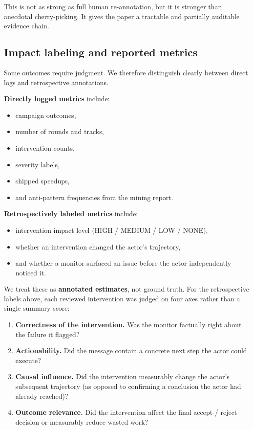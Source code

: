 \documentclass[11pt]{article}
\begin{document}
This is not as strong as full human re-annotation, but it is stronger than anecdotal cherry-picking. It gives the paper a tractable and partially auditable evidence chain.

\subsection{Impact labeling and reported metrics}
\label{sec:impact-labeling}

Some outcomes require judgment. We therefore distinguish clearly between direct logs and retrospective annotations.

\textbf{Directly logged metrics} include:
\begin{itemize}[leftmargin=*,itemsep=2pt]
  \item campaign outcomes,
  \item number of rounds and tracks,
  \item intervention counts,
  \item severity labels,
  \item shipped speedups,
  \item and anti-pattern frequencies from the mining report.
\end{itemize}

\textbf{Retrospectively labeled metrics} include:
\begin{itemize}[leftmargin=*,itemsep=2pt]
  \item intervention impact level (HIGH / MEDIUM / LOW / NONE),
  \item whether an intervention changed the actor's trajectory,
  \item and whether a monitor surfaced an issue before the actor independently noticed it.
\end{itemize}

We treat these as \textbf{annotated estimates}, not ground truth. For the retrospective labels above, each reviewed intervention was judged on four axes rather than a single summary score:

\begin{enumerate}[leftmargin=*,itemsep=2pt]
  \item \textbf{Correctness of the intervention.} Was the monitor factually right about the failure it flagged?
  \item \textbf{Actionability.} Did the message contain a concrete next step the actor could execute?
  \item \textbf{Causal influence.} Did the intervention measurably change the actor's subsequent trajectory (as opposed to confirming a conclusion the actor had already reached)?
  \item \textbf{Outcome relevance.} Did the intervention affect the final accept / reject decision or measurably reduce wasted work?
\end{enumerate}
\end{document}

